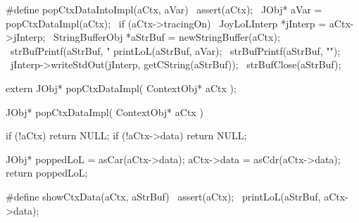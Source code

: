 #define popCtxDataIntoImpl(aCtx, aVar)                \
assert(aCtx);                                         \
JObj* aVar = popCtxDataImpl(aCtx);                    \
if (aCtx->tracingOn) {                                \
  JoyLoLInterp *jInterp = aCtx->jInterp;              \
  StringBufferObj *aStrBuf = newStringBuffer(aCtx);   \
  strBufPrintf(aStrBuf, "%
  printLoL(aStrBuf, aVar);                            \
  strBufPrintf(aStrBuf, "\n");                        \
  jInterp->writeStdOut(jInterp, getCString(aStrBuf)); \
  strBufClose(aStrBuf);                               \
}
\stopCHeader

\setCHeaderStream{private}
\startCHeader
extern JObj* popCtxDataImpl(
  ContextObj* aCtx
);
\stopCHeader
\setCHeaderStream{public}

\startCCode
JObj* popCtxDataImpl(
  ContextObj* aCtx
) {
  if (!aCtx) return NULL;
  if (!aCtx->data) return NULL;

  JObj* poppedLoL = asCar(aCtx->data);
  aCtx->data          = asCdr(aCtx->data);
  return poppedLoL;
}
\stopCCode

\startCHeader
#define showCtxData(aCtx, aStrBuf)  \
  assert(aCtx);                     \
  printLoL(aStrBuf, aCtx->data);    \
\stopCHeader

